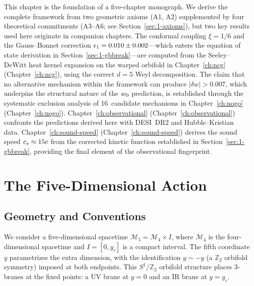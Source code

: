 This chapter is the foundation of a five-chapter monograph. We derive the complete framework from two geometric axioms (A1, A2) supplemented by four theoretical commitments (A3--A6; see Section~\ref{sec:1-axioms}), but two key results used here originate in companion chapters. The conformal coupling $\xi = 1/6$ and the Gauss--Bonnet correction $\epsilon_1 = 0.010 \pm 0.002$---which enters the equation of state derivation in Section~\ref{sec:1-gbbreak}---are computed from the Seeley--DeWitt heat kernel expansion on the warped orbifold in Chapter~\ref{ch:ncg} (Chapter~\ref{ch:ncg}), using the correct $d = 5$ Weyl decomposition. The claim that no alternative mechanism within the framework can produce $|\delta w| > 0.007$, which underpins the structural nature of the $w_0$ prediction, is established through the systematic exclusion analysis of 16~candidate mechanisms in Chapter~\ref{ch:nogo} (Chapter~\ref{ch:nogo}). Chapter~\ref{ch:observational} (Chapter~\ref{ch:observational}) confronts the predictions derived here with DESI~DR2 and Hubble--Kristian data. Chapter~\ref{ch:sound-speed} (Chapter~\ref{ch:sound-speed}) derives the sound speed $c_s \approx 15c$ from the corrected kinetic function established in Section~\ref{sec:1-gbbreak}, providing the final element of the observational fingerprint.


\section{The Five-Dimensional Action}
\label{sec:1-5daction}

\subsection{Geometry and Conventions}
\label{sec:1-geometry}

We consider a five-dimensional spacetime $\mathcal{M}_5 = \mathcal{M}_4 \times I$, where $\mathcal{M}_4$ is the four-dimensional spacetime and $I = [0, y_c]$ is a compact interval. The fifth coordinate $y$ parametrizes the extra dimension, with the identification $y \sim -y$ (a $\mathbb{Z}_2$ orbifold symmetry) imposed at both endpoints. This $S^1/\mathbb{Z}_2$ orbifold structure places 3-branes at the fixed points: a UV brane at $y = 0$ and an IR brane at $y = y_c$.

